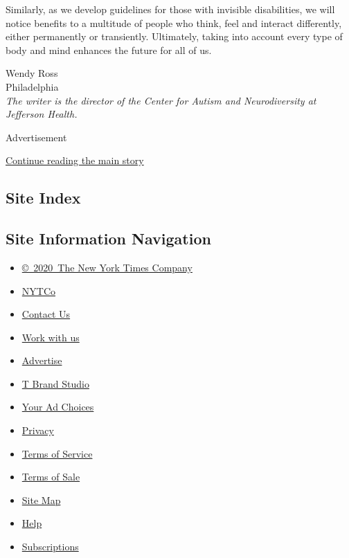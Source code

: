 Similarly, as we develop guidelines for those with invisible
disabilities, we will notice benefits to a multitude of people who
think, feel and interact differently, either permanently or transiently.
Ultimately, taking into account every type of body and mind enhances the
future for all of us.

Wendy Ross\\
Philadelphia\\
\emph{The writer is the director of the Center for Autism and
Neurodiversity at Jefferson Health.}

Advertisement

\protect\hyperlink{after-bottom}{Continue reading the main story}

\hypertarget{site-index}{%
\subsection{Site Index}\label{site-index}}

\hypertarget{site-information-navigation}{%
\subsection{Site Information
Navigation}\label{site-information-navigation}}

\begin{itemize}
\tightlist
\item
  \href{https://help.nytimes.com/hc/en-us/articles/115014792127-Copyright-notice}{©~2020~The
  New York Times Company}
\end{itemize}

\begin{itemize}
\tightlist
\item
  \href{https://www.nytco.com/}{NYTCo}
\item
  \href{https://help.nytimes.com/hc/en-us/articles/115015385887-Contact-Us}{Contact
  Us}
\item
  \href{https://www.nytco.com/careers/}{Work with us}
\item
  \href{https://nytmediakit.com/}{Advertise}
\item
  \href{http://www.tbrandstudio.com/}{T Brand Studio}
\item
  \href{https://www.nytimes.com/privacy/cookie-policy\#how-do-i-manage-trackers}{Your
  Ad Choices}
\item
  \href{https://www.nytimes.com/privacy}{Privacy}
\item
  \href{https://help.nytimes.com/hc/en-us/articles/115014893428-Terms-of-service}{Terms
  of Service}
\item
  \href{https://help.nytimes.com/hc/en-us/articles/115014893968-Terms-of-sale}{Terms
  of Sale}
\item
  \href{https://spiderbites.nytimes.com}{Site Map}
\item
  \href{https://help.nytimes.com/hc/en-us}{Help}
\item
  \href{https://www.nytimes.com/subscription?campaignId=37WXW}{Subscriptions}
\end{itemize}

